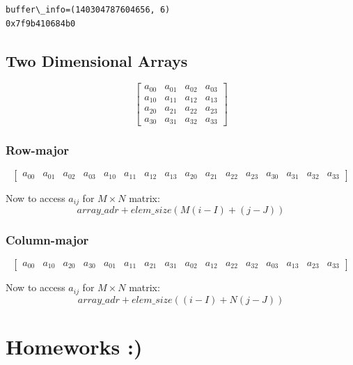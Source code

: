 \documentclass[11pt]{article}
\begin{document}
    \begin{Verbatim}[commandchars=\\\{\}]
buffer\_info=(140304787604656, 6)
0x7f9b410684b0
    \end{Verbatim}

    \hypertarget{two-dimensional-arrays}{%
\subsection{Two Dimensional Arrays}\label{two-dimensional-arrays}}

\[
\displaystyle \begin{bmatrix}
a_{00} & a_{01} & a_{02} & a_{03}\\
a_{10} & a_{11} & a_{12} & a_{13}\\
a_{20} & a_{21} & a_{22} & a_{23}\\
a_{30} & a_{31} & a_{32} & a_{33}
\end{bmatrix}
\]

\hypertarget{row-major}{%
\subsubsection{Row-major}\label{row-major}}

\[
\begin{bmatrix}
a_{00} & a_{01} & a_{02} & a_{03} & a_{10} & a_{11} & a_{12} & a_{13}& a_{20} & a_{21} & a_{22} & a_{23} & a_{30} & a_{31} & a_{32} & a_{33}
\end{bmatrix}
\]

Now to access \(a_{ij}\) for \(M\times N\) matrix: \[
array\_adr + elem\_size (M(i-I)+(j-J))
\]

\hypertarget{column-major}{%
\subsubsection{Column-major}\label{column-major}}

\[
\begin{bmatrix}
a_{00} & a_{10} & a_{20} & a_{30} & a_{01} & a_{11} & a_{21} & a_{31}& a_{02} & a_{12} & a_{22} & a_{32}& a_{03} & a_{13} & a_{23} & a_{33}
\end{bmatrix}
\]

Now to access \(a_{ij}\) for \(M\times N\) matrix: \[
array\_adr + elem\_size ((i-I)+N(j-J))
\]

    \hypertarget{homeworks}{%
\section{Homeworks :)}\label{homeworks}}
\end{document}
